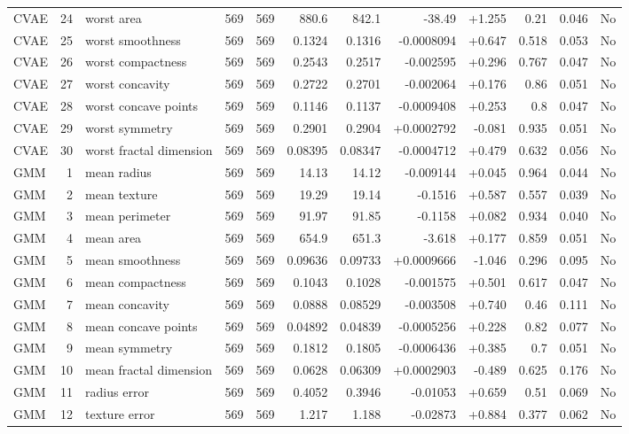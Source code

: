 \begin{landscape}
\begin{longtable}{@{}lrp{4.0cm}rrrrrrrrr@{}}
CVAE & 24 & worst area & 569 & 569 & 880.6 & 842.1 & -38.49 & +1.255 & 0.21 & 0.046 & No \\
CVAE & 25 & worst smoothness & 569 & 569 & 0.1324 & 0.1316 & -0.0008094 & +0.647 & 0.518 & 0.053 & No \\
CVAE & 26 & worst compactness & 569 & 569 & 0.2543 & 0.2517 & -0.002595 & +0.296 & 0.767 & 0.047 & No \\
CVAE & 27 & worst concavity & 569 & 569 & 0.2722 & 0.2701 & -0.002064 & +0.176 & 0.86 & 0.051 & No \\
CVAE & 28 & worst concave points & 569 & 569 & 0.1146 & 0.1137 & -0.0009408 & +0.253 & 0.8 & 0.047 & No \\
CVAE & 29 & worst symmetry & 569 & 569 & 0.2901 & 0.2904 & +0.0002792 & -0.081 & 0.935 & 0.051 & No \\
CVAE & 30 & worst fractal dimension & 569 & 569 & 0.08395 & 0.08347 & -0.0004712 & +0.479 & 0.632 & 0.056 & No \\
GMM & 1 & mean radius & 569 & 569 & 14.13 & 14.12 & -0.009144 & +0.045 & 0.964 & 0.044 & No \\
GMM & 2 & mean texture & 569 & 569 & 19.29 & 19.14 & -0.1516 & +0.587 & 0.557 & 0.039 & No \\
GMM & 3 & mean perimeter & 569 & 569 & 91.97 & 91.85 & -0.1158 & +0.082 & 0.934 & 0.040 & No \\
GMM & 4 & mean area & 569 & 569 & 654.9 & 651.3 & -3.618 & +0.177 & 0.859 & 0.051 & No \\
GMM & 5 & mean smoothness & 569 & 569 & 0.09636 & 0.09733 & +0.0009666 & -1.046 & 0.296 & 0.095 & No \\
GMM & 6 & mean compactness & 569 & 569 & 0.1043 & 0.1028 & -0.001575 & +0.501 & 0.617 & 0.047 & No \\
GMM & 7 & mean concavity & 569 & 569 & 0.0888 & 0.08529 & -0.003508 & +0.740 & 0.46 & 0.111 & No \\
GMM & 8 & mean concave points & 569 & 569 & 0.04892 & 0.04839 & -0.0005256 & +0.228 & 0.82 & 0.077 & No \\
GMM & 9 & mean symmetry & 569 & 569 & 0.1812 & 0.1805 & -0.0006436 & +0.385 & 0.7 & 0.051 & No \\
GMM & 10 & mean fractal dimension & 569 & 569 & 0.0628 & 0.06309 & +0.0002903 & -0.489 & 0.625 & 0.176 & No \\
GMM & 11 & radius error & 569 & 569 & 0.4052 & 0.3946 & -0.01053 & +0.659 & 0.51 & 0.069 & No \\
GMM & 12 & texture error & 569 & 569 & 1.217 & 1.188 & -0.02873 & +0.884 & 0.377 & 0.062 & No \\

\end{longtable}
\end{landscape}
